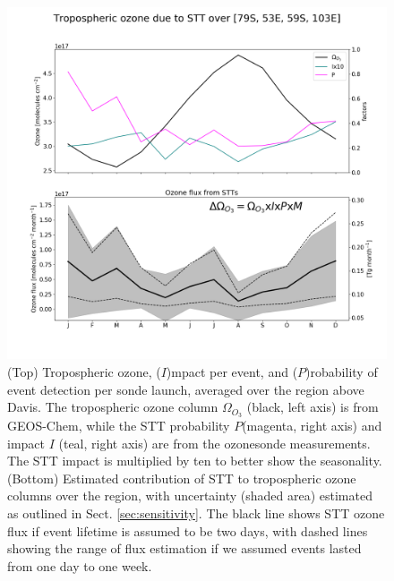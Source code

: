 \documentclass[acp, manuscript]{copernicus} %
\begin{document}
    
    \begin{figure}
      \includegraphics[width=12.0cm]{figures/STT_extrapolation_Dav.png}
      \caption{%
	(Top) Tropospheric ozone, ($I$)mpact per event, and ($P$)robability of event detection per sonde launch, averaged over the region above Davis.
	The tropospheric ozone column $\Omega_{O_3}$ (black, left axis) is from GEOS-Chem, while the STT probability  $P$(magenta, right axis) and impact $I$ (teal, right axis) are from the ozonesonde measurements.
	The STT impact is multiplied by ten to better show the seasonality.
	(Bottom) Estimated contribution of STT to tropospheric ozone columns over the region, with uncertainty (shaded area) estimated as outlined in Sect. \ref{sec:sensitivity}.
	The black line shows STT ozone flux if event lifetime is assumed to be two days, with dashed lines showing the range of flux estimation if we assumed events lasted from one day to one week.}
      \label{fig:DavExtrapolation}
    \end{figure}
\end{document}
